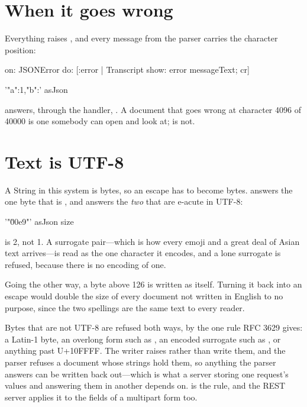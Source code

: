 \section{When it goes wrong}

Everything raises , and every message from the parser carries
the character position:

\begin{st}
    on: JSONError
    do: [:error | Transcript show: error messageText; cr]
\end{st}

\begin{st}
'{"a":1,"b":}' asJson
\end{st}

\noindent answers, through the handler, . A document that goes wrong at character 4096 of 40000 is one
somebody can open and look at;  is not.

\section{Text is UTF-8}

A String in this system is bytes, so an escape has to become bytes.
 answers the one byte that is , and  answers the
\emph{two} that are e-acute in UTF-8:

\begin{st}
'"\u00e9"' asJson size
\end{st}

\noindent is 2, not 1. A surrogate pair---which is how every emoji and a
great deal of Asian text arrives---is read as the one character it encodes,
and a lone surrogate is refused, because there is no encoding of one.

Going the other way, a byte above 126 is written as itself. Turning it back
into an escape would double the size of every document not written in English
to no purpose, since the two spellings are the same text to every reader.

Bytes that are not UTF-8 are refused both ways, by the one rule RFC 3629
gives: a Latin-1 byte, an overlong form such as , an encoded
surrogate such as , or anything past U+10FFFF. The writer raises
 rather than write them, and the parser refuses a document whose
strings hold them, so anything the parser answers can be written back
out---which is what a server storing one request's values and answering them
in another depends on.  is the rule,
and the REST server applies it to the fields of a multipart form too.

